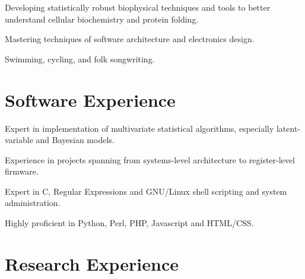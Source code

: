\documentclass[letterpaper]{article}
\renewenvironment{itemize}{
  \begin{list}{}{
    \setlength{\leftmargin}{1.5em}
  }
}{
  \end{list}
}
\begin{document}
\begin{itemize}
\item{
  Developing statistically robust biophysical techniques and tools to better
  understand cellular biochemistry and protein folding.
}
\item{
  Mastering techniques of software architecture and electronics design.
}
\item{
  Swimming, cycling, and folk songwriting.
}
\end{itemize}


\section*{Software Experience}

\begin{itemize}
\item{
  Expert in implementation of multivariate statistical algorithms,
  especially latent-variable and Bayesian models.
}
\item{
  Experience in projects spanning from systems-level architecture to
  register-level firmware.
}
\item{
  Expert in C, Regular Expressions and GNU/Linux shell scripting and
  system administration.
}
\item{
  Highly proficient in Python, Perl, PHP, Javascript and HTML/CSS.
}
\end{itemize}


\section*{Research Experience}
\end{document}
